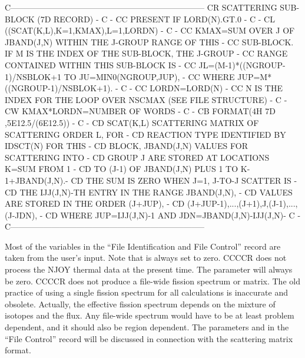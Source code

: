 \begin{ccode}
C-----------------------------------------------------------------------
CR          SCATTERING SUB-BLOCK   (7D RECORD)                         -
C                                                                      -
CC          PRESENT IF LORD(N).GT.0                                    -
C                                                                      -
CL    ((SCAT(K,L),K=1,KMAX),L=1,LORDN)                                 -
C                                                                      -
CC    KMAX=SUM OVER J OF JBAND(J,N) WITHIN THE J-GROUP RANGE OF THIS   -
CC       SUB-BLOCK.  IF M IS THE INDEX OF THE SUB-BLOCK, THE J-GROUP   -
CC       RANGE CONTAINED WITHIN THIS SUB-BLOCK IS                      -
CC       JL=(M-1)*((NGROUP-1)/NSBLOK+1 TO JU=MIN0(NGROUP,JUP),         -
CC       WHERE JUP=M*((NGROUP-1)/NSBLOK+1).                            -
C                                                                      -
CC    LORDN=LORD(N)                                                    -
CC    N IS THE INDEX FOR THE LOOP OVER NSCMAX (SEE FILE STRUCTURE)     -
C                                                                      -
CW    KMAX*LORDN=NUMBER OF WORDS                                       -
C                                                                      -
CB    FORMAT(4H 7D ,5E12.5/(6E12.5))                                   -
C                                                                      -
CD    SCAT(K,L)     SCATTERING MATRIX OF SCATTERING ORDER L, FOR       -
CD                     REACTION TYPE IDENTIFIED BY IDSCT(N) FOR THIS   -
CD                     BLOCK, JBAND(J,N) VALUES FOR SCATTERING INTO    -
CD                     GROUP J ARE STORED AT LOCATIONS K=SUM FROM 1    -
CD                     TO (J-1) OF JBAND(J,N) PLUS 1 TO K-1+JBAND(J,N).-
CD                     THE SUM IS ZERO WHEN J=1, J-TO-J SCATTER IS     -
CD                     THE IJJ(J,N)-TH ENTRY IN THE RANGE JBAND(J,N),  -
CD                     VALUES ARE STORED IN THE ORDER (J+JUP),         -
CD                     (J+JUP-1),...,(J+1),J,(J-1),...,(J-JDN),        -
CD                     WHERE JUP=IJJ(J,N)-1 AND JDN=JBAND(J,N)-IJJ(J,N)-
C                                                                      -
C-----------------------------------------------------------------------

\end{ccode}
\normalsize
\vspace{1 pt}

Most of the variables in the ``File Identification and File Control''
record are taken from the user's input.  Note that 
is always set to zero.  CCCCR does not process the NJOY thermal data
at the present time.  The  parameter will always be
zero.  CCCCR does not produce a file-wide fission spectrum or matrix.
The old practice of using a single fission spectrum for all calculations
is inaccurate and obsolete.  Actually, the effective fission spectrum
depends on the mixture of isotopes and the flux.  Any file-wide spectrum
would have to be at least problem dependent, and it should also be
region dependent.  The parameters  and 
in the ``File Control'' record will be discussed in connection with
the scattering matrix format.

